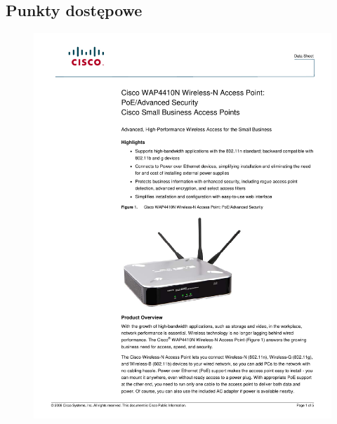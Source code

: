\documentclass[a4paper, 12pt]{article}
\begin{document}
\subsection{Punkty dostępowe}
\begin{figure}[H]
\centering
    \includegraphics[scale=0.80]{spec/access.pdf}%
    \label{fig:PropProf}
\end{figure}
\end{document}
